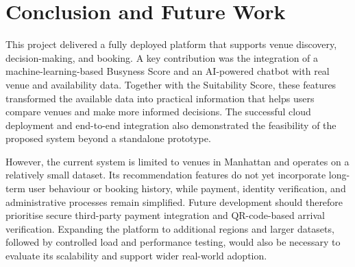 ﻿\documentclass[conference,a4paper]{IEEEtran}
\newif\ifshowguidance
\newcommand{\guidance}[1]{%
  \ifshowguidance
    \par\smallskip
    \noindent\fcolorbox{gray}{gray!8}{%
      \parbox{\dimexpr\columnwidth-2\fboxsep-2\fboxrule\relax}{%
        \footnotesize\color{gray!75!black}\textbf{Draft guidance:} #1}}
    \par\smallskip
  \fi
}
\begin{document}
\section{Conclusion and Future Work}
\label{sec:conclusion}
\guidance{Target: 0.60--0.70 page. Answer the project objectives using the
reported results, state the contribution, acknowledge technical and
evaluation limitations, and propose realistic future work with its expected
impact. Do not introduce new evidence here.}


This project delivered a fully deployed platform that supports venue discovery, decision-making, and booking. A key contribution was the integration of a machine-learning-based Busyness Score and an AI-powered chatbot with real venue and availability data. Together with the Suitability Score, these features transformed the available data into practical information that helps users compare venues and make more informed decisions. The successful cloud deployment and end-to-end integration also demonstrated the feasibility of the proposed system beyond a standalone prototype.

However, the current system is limited to venues in Manhattan and operates on a relatively small dataset. Its recommendation features do not yet incorporate long-term user behaviour or booking history, while payment, identity verification, and administrative processes remain simplified. Future development should therefore prioritise secure third-party payment integration and QR-code-based arrival verification. Expanding the platform to additional regions and larger datasets, followed by controlled load and performance testing, would also be necessary to evaluate its scalability and support wider real-world adoption.
\end{document}
